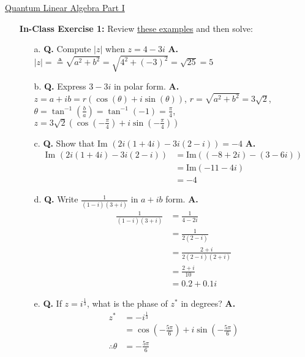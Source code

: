 \documentclass[main.tex]{subfiles}
\begin{document}
\href{https://www2.seas.gwu.edu/~simhaweb/quantum/modules/module2/module2.html}{Quantum Linear Algebra Part I}

\begin{enumerate}

\item[] \textbf{In-Class Exercise 1:} Review \href{https://www2.seas.gwu.edu/~simhaweb/quantum/modules/module2/problems2.html#complex}{these examples} and then solve:

    \begin{enumerate}
        \item[a.] \textbf{Q.} Compute $|z|$ when $z = 4-3i$ \textbf{A.} $|z| = \triangleq \sqrt{a^{2}+b^{2}} = \sqrt{4^2 + (-3)^2} = \sqrt{25} = 5$ 
        
        \item[b.] \textbf{Q.} Express $3-3 i$ in polar form. \textbf{A.} $z=a+ib=r(\cos (\theta)+i \sin (\theta))$, $r=\sqrt{a^2 + b^2} = 3\sqrt{2}$, $\theta = \tan^{-1}(\frac{b}{a}) = \tan^{-1}(-1) = \frac{\pi}{4}$, $z=3\sqrt{2}(\cos (-\frac{\pi}{4})+i \sin (-\frac{\pi}{4}))$  
        
        \item[c.] \textbf{Q.} Show that Im $(2 i(1+4 i)-3 i(2-i))=-4$ \textbf{A.} 
        \begin{align*}
            \text{Im }(2i(1+4i)-3i(2-i)) &= \text{Im}((-8 + 2i) - (3 - 6i))\\
                                    &= \text{Im}(-11 - 4i)\\
                                    &= -4
        \end{align*}
        
        \item[d.] \textbf{Q.} Write $\frac{1}{(1-i)(3+i)}$ in $a+ib$ form. \textbf{A.}
        \begin{align*}
            \frac{1}{(1-i)(3+i)} &= \frac{1}{4-2i}\\
                                    &= \frac{1}{2(2-i)}\\
                                    &= \frac{2+i}{2(2-i)(2+i)}\\
                                    &= \frac{2+i}{10}\\
                                    &= 0.2 + 0.1i
        \end{align*}
        
        \item[e.] \textbf{Q.} If $z=i^{\frac{1}{3}}$, what is the phase of $z^{*}$ in degrees? \textbf{A.}
        \begin{align*}
            z^{*} &= -i^{\frac{1}{3}}\\
                    &= \cos \left(-\frac{5 \pi}{6}\right)+i \sin \left(-\frac{5 \pi}{6}\right)\\
            \therefore \theta &= -\frac{5\pi}{6}
        \end{align*}
    \end{enumerate}


\end{enumerate}
\end{document}
